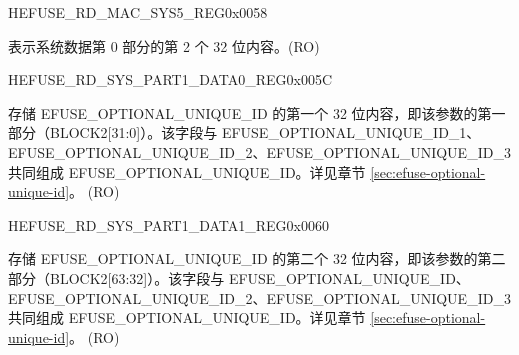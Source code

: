 \begin{register}{H}{EFUSE\_RD\_MAC\_SYS5\_REG}{0x0058}\label{regdesc:EFUSERDMACSYS5REG}
%
\regnewline%
\begin{regdesc}\begin{reglist}
\label{fielddesc:EFUSESYSDATAPART02}\item [EFUSE\_SYS\_DATA\_PART0\_2] 表示系统数据第 0 部分的第 2 个 32 位内容。(RO)
\end{reglist}\end{regdesc}
\end{register}


\begin{register}{H}{EFUSE\_RD\_SYS\_PART1\_DATA0\_REG}{0x005C}\label{regdesc:EFUSERDSYSPART1DATA0REG}\label{regdesc:EFUSERDSYSPART1DATANREG}
%
\regnewline%
\begin{regdesc}\begin{reglist}
\label{fielddesc:EFUSEOPTIONALUNIQUEID}\item [EFUSE\_OPTIONAL\_UNIQUE\_ID] 存储 EFUSE\_OPTIONAL\_UNIQUE\_ID 的第一个 32 位内容，即该参数的第一部分（BLOCK2[31:0]）。该字段与 EFUSE\_OPTIONAL\_UNIQUE\_ID\_1、EFUSE\_OPTIONAL\_UNIQUE\_ID\_2、EFUSE\_OPTIONAL\_UNIQUE\_ID\_3 共同组成 EFUSE\_OPTIONAL\_UNIQUE\_ID。详见章节 \ref{sec:efuse-optional-unique-id}。 (RO)
\end{reglist}\end{regdesc}
\end{register}


\begin{register}{H}{EFUSE\_RD\_SYS\_PART1\_DATA1\_REG}{0x0060}\label{regdesc:EFUSERDSYSPART1DATA1REG}
%
\regnewline%
\begin{regdesc}\begin{reglist}
\label{fielddesc:EFUSEOPTIONALUNIQUEID1}\item [EFUSE\_OPTIONAL\_UNIQUE\_ID\_1] 存储 EFUSE\_OPTIONAL\_UNIQUE\_ID 的第二个 32 位内容，即该参数的第二部分（BLOCK2[63:32]）。该字段与 EFUSE\_OPTIONAL\_UNIQUE\_ID、EFUSE\_OPTIONAL\_UNIQUE\_ID\_2、EFUSE\_OPTIONAL\_UNIQUE\_ID\_3 共同组成 EFUSE\_OPTIONAL\_UNIQUE\_ID。详见章节 \ref{sec:efuse-optional-unique-id}。 (RO)
\end{reglist}\end{regdesc}
\end{register}


